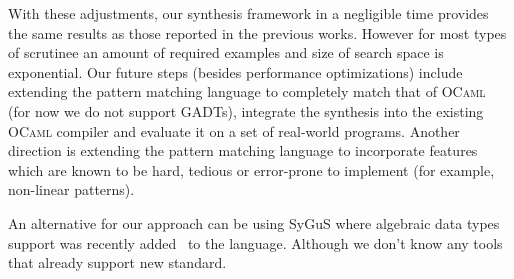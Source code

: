 \documentclass[submission,copyright,creativecommons]{eptcs}
\begin{document}
With these adjustments, our synthesis framework in a negligible time provides the same results as those reported in the previous works. However for most types of scrutinee an amount of required examples and size of search space is  exponential.
Our future steps (besides performance optimizations) include extending the pattern matching language to completely match that of \textsc{OCaml} (for
now we do not support GADTs), integrate the synthesis into the existing \textsc{OCaml} compiler and evaluate it on a
set of real-world programs. Another direction is extending the pattern matching language to incorporate features which
are known to be hard, tedious or error-prone to implement (for example, non-linear patterns).

An alternative for our approach can be using SyGuS where algebraic data types support was recently added~\cite{raghothamansygus} to the language. Although we don't know any tools that already support new standard.
\end{document}
